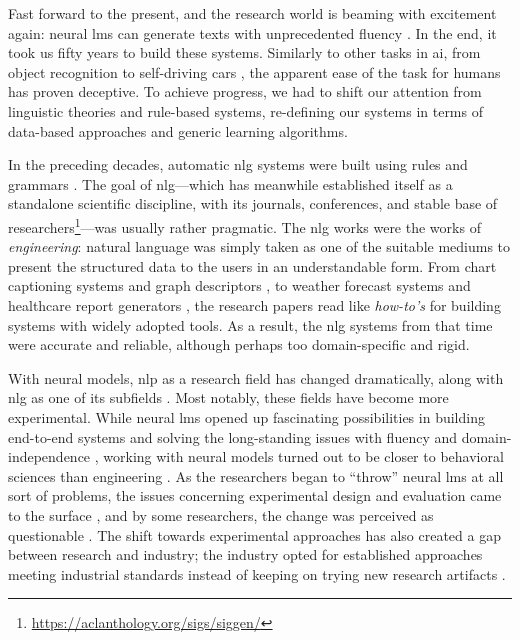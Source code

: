 Fast forward to the present, and the research world is beaming with excitement again: neural \acp{lm} can generate texts with unprecedented fluency \cite{radford2019language,brown2020language}. In the end, it took us fifty years to build these systems. Similarly to other tasks in \ac{ai}, from object recognition \cite{papert1966summer} to self-driving cars \cite{autonomouscars}, the apparent ease of the task for humans has proven deceptive.  To achieve progress, we had to shift our attention from linguistic theories and rule-based systems, re-defining our systems in terms of data-based approaches and generic learning algorithms.

In the preceding decades, automatic \ac{nlg} systems were built using rules and grammars \cite{reiterBuildingAppliedNatural1997,gattSurveyStateArt2018}. The goal of \ac{nlg}---which has meanwhile established itself as a standalone scientific discipline, with its journals, conferences, and stable base of researchers\footnote{\url{https://aclanthology.org/sigs/siggen/}}---was usually rather pragmatic.
The \ac{nlg} works were the works of \emph{engineering}: natural language was simply taken as one of the suitable mediums to present the structured data to the users in an understandable form. From chart captioning systems \cite{mittalDescribingComplexCharts1998} and graph descriptors \cite{sunDomainIndependentSentence2006}, to weather forecast systems \cite{belzAutomaticGenerationWeather2008} and healthcare report generators \cite{portetAutomaticGenerationTextual2009}, the research papers read like \emph{how-to's} for building systems with widely adopted tools. As a result, the \ac{nlg} systems from that time were accurate and reliable, although perhaps too domain-specific and rigid.


With neural models, \ac{nlp} as a research field has changed dramatically, along with \ac{nlg} as one of its subfields \cite{gururaja2023build,li2023defining}. Most notably, these fields have become more experimental. While neural \acp{lm} opened up fascinating possibilities in building end-to-end systems and solving the long-standing issues with fluency and domain-independence \cite{ferreiraNeuralDatatotextGeneration2019,dusekEvaluatingStateoftheartEndtoEnd2020,sharmaInnovationsNeuralDatatotext2022}, working with neural models turned out to be closer to behavioral sciences than engineering \cite{holtzmanGenerativeModelsComplex2023}. As the researchers began to ``throw'' neural \acp{lm} at all sort of problems, the issues concerning experimental design and evaluation came to the surface \cite{gehrmannRepairingCrackedFoundation2022}, and by some researchers, the change was perceived as questionable \cite{reiter2020academic,gururaja2023build,michael2023nlp}. The shift towards experimental approaches has also created a gap between research and industry; the industry opted for established approaches meeting industrial standards instead of keeping on trying new research artifacts \cite{daleNaturalLanguageGeneration2020,daleNavigatingTextGeneration2023}.


